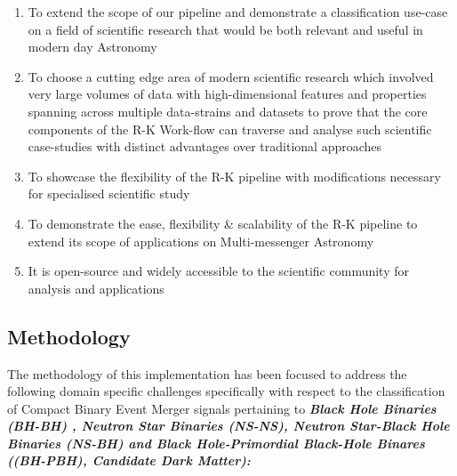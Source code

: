     \begin{enumerate}
        \item {To extend the scope of our pipeline and demonstrate a classification use-case on a field of scientific research that would be both relevant and useful in modern day Astronomy}
        \item{To choose a cutting edge area of modern scientific research which involved very large volumes of data with high-dimensional features and properties spanning across multiple data-strains and datasets to prove that the core components of the R-K Work-flow can traverse and analyse such scientific case-studies with distinct advantages over traditional approaches}
        \item {To showcase the flexibility of the R-K pipeline with modifications necessary for specialised scientific study}
        \item{To demonstrate the ease, flexibility \& scalability of the R-K pipeline to extend its scope of applications on Multi-messenger Astronomy }
        \item{It is open-source and widely accessible to the scientific community for analysis and applications }
    \end{enumerate}

    \subsection{Methodology}
    The methodology of this implementation has been focused to address the following domain specific challenges specifically with respect to the classification of Compact Binary Event Merger signals pertaining to \textbf{\textit{Black Hole Binaries (BH-BH) , Neutron Star Binaries (NS-NS), Neutron Star-Black Hole Binaries (NS-BH) and Black Hole-Primordial Black-Hole Binares ((BH-PBH), Candidate Dark Matter):}}

